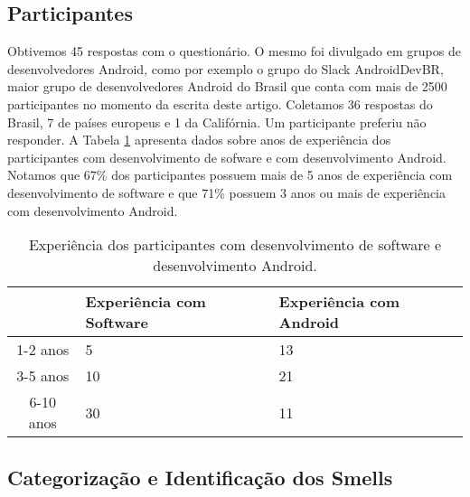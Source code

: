 \subsection{Participantes}
\label{sub:participantes}

Obtivemos 45 respostas com o question\'ario. O mesmo foi divulgado em grupos de desenvolvedores Android, como por exemplo o grupo do Slack AndroidDevBR, maior grupo de desenvolvedores Android do Brasil que conta com mais de 2500 participantes no momento da escrita deste artigo. Coletamos 36 respostas do Brasil, 7 de pa\'ises europeus e 1 da Calif\'ornia. Um participante preferiu n\~ao responder. A Tabela \ref{tab:DadosDemograficos} apresenta dados sobre anos de experi\^encia dos participantes com desenvolvimento de sofware e com desenvolvimento Android. Notamos que 67\% dos participantes possuem mais de 5 anos de experi\^encia com desenvolvimento de software e que 71\% possuem 3 anos ou mais de experi\^encia com desenvolvimento Android.

\begin{table}[h]
\centering
\caption{Experi\^encia dos participantes com desenvolvimento de software e desenvolvimento Android.}
\begin{tabular}{c|p{2cm}p{2cm}}
& Experi\^encia com Software & Experi\^encia com Android \\
\hline
1-2 anos &	5  &	13 \\
3-5 anos &	10 &	21 \\
6-10 anos &	30 &	11 \\
\end{tabular}
\label{tab:DadosDemograficos}
\end{table}


\subsection{Categoriza\c{c}\~ao e Identifica\c{c}\~ao dos Smells}
\label{sub:smells-definition}

